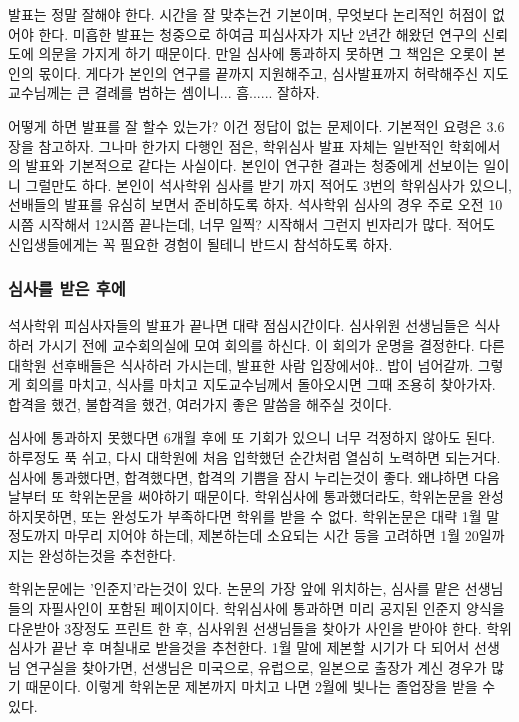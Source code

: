 발표는 정말 잘해야 한다. 시간을 잘 맞추는건 기본이며, 무엇보다 논리적인 허점이
없어야 한다. 미흡한 발표는 청중으로 하여금 피심사자가 지난 2년간 해왔던 연구의
신뢰도에 의문을 가지게 하기 때문이다. 만일 심사에 통과하지 못하면 그 책임은
오롯이 본인의 몫이다. 게다가 본인의 연구를 끝까지 지원해주고, 심사발표까지
허락해주신 지도교수님께는 큰 결례를 범하는 셈이니... 흠...... 잘하자.

어떻게 하면 발표를 잘 할수 있는가? 이건 정답이 없는 문제이다. 기본적인 요령은
3.6장을 참고하자. 그나마 한가지 다행인 점은, 학위심사 발표 자체는 일반적인
학회에서의 발표와 기본적으로 같다는 사실이다. 본인이 연구한 결과는 청중에게
선보이는 일이니 그럴만도 하다. 본인이 석사학위 심사를 받기 까지 적어도 3번의
학위심사가 있으니, 선배들의 발표를 유심히 보면서 준비하도록 하자. 석사학위 심사의
경우 주로 오전 10시쯤 시작해서 12시쯤 끝나는데, 너무 일찍? 시작해서 그런지
빈자리가 많다. 적어도 신입생들에게는 꼭 필요한 경험이 될테니 반드시 참석하도록
하자.
 
\subsubsection{심사를 받은 후에}
석사학위 피심사자들의 발표가 끝나면 대략 점심시간이다. 심사위원 선생님들은
식사하러 가시기 전에 교수회의실에 모여 회의를 하신다. 이 회의가 운명을
결정한다. 다른 대학원 선후배들은 식사하러 가시는데, 발표한 사람 입장에서야.. 밥이
넘어갈까. 그렇게 회의를 마치고, 식사를 마치고 지도교수님께서 돌아오시면 그때
조용히 찾아가자. 합격을 했건, 불합격을 했건, 여러가지 좋은 말씀을 해주실 것이다.

심사에 통과하지 못했다면 6개월 후에 또 기회가 있으니 너무 걱정하지 않아도
된다. 하루정도 푹 쉬고, 다시 대학원에 처음 입학했던 순간처럼 열심히 노력하면
되는거다. 심사에 통과했다면, 합격했다면, 합격의 기쁨을 잠시 누리는것이
좋다. 왜냐하면 다음날부터 또 학위논문을 써야하기 때문이다. 학위심사에
통과했더라도, 학위논문을 완성하지못하면, 또는 완성도가 부족하다면 학위를 받을 수
없다. 학위논문은 대략 1월 말 정도까지 마무리 지어야 하는데, 제본하는데 소요되는
시간 등을 고려하면 1월 20일까지는 완성하는것을 추천한다.

학위논문에는 '인준지'라는것이 있다. 논문의 가장 앞에 위치하는, 심사를 맡은
선생님들의 자필사인이 포함된 페이지이다. 학위심사에 통과하면 미리 공지된 인준지
양식을 다운받아 3장정도 프린트 한 후, 심사위원 선생님들을 찾아가 사인을 받아야
한다. 학위심사가 끝난 후 며칠내로 받을것을 추천한다. 1월 말에 제본할 시기가 다
되어서 선생님 연구실을 찾아가면, 선생님은 미국으로, 유럽으로, 일본으로 출장가
계신 경우가 많기 때문이다. 이렇게 학위논문 제본까지 마치고 나면 2월에 빛나는
졸업장을 받을 수 있다.


